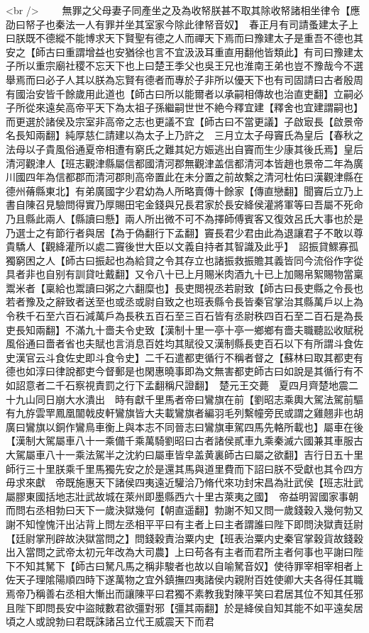 <br />
　　無罪之父母妻子同產坐之及為收帑朕甚不取其除收帑諸相坐律令【應劭曰帑子也秦法一人有罪并坐其室家今除此律帑音奴】　春正月有司請蚤建太子上曰朕既不德縱不能博求天下賢聖有德之人而禪天下焉而曰豫建太子是重吾不德也其安之【師古曰重謂增益也安猶徐也言不宜汲汲耳重直用翻他皆類此】有司曰豫建太子所以重宗廟社稷不忘天下也上曰楚王季父也吳王兄也淮南王弟也豈不豫哉今不選舉焉而曰必子人其以朕為忘賢有德者而專於子非所以優天下也有司固請曰古者殷周有國治安皆千餘歲用此道也【師古曰所以能爾者以承嗣相傳故也治直吏翻】立嗣必子所從來遠矣高帝平天下為太祖子孫繼嗣世世不絶今釋宜建【釋舍也宜建謂嗣也】而更選於諸侯及宗室非高帝之志也更議不宜【師古曰不當更議】子啟㝡長【啟景帝名長知兩翻】純厚慈仁請建以為太子上乃許之　三月立太子母竇氏為皇后【春秋之法母以子貴風俗通夏帝相遭有窮氏之難其妃方娠逃出自竇而生少康其後氏焉】皇后清河觀津人【班志觀津縣屬信都國清河郡無觀津盖信都清河本皆趙也景帝二年為廣川國四年為信都郡而清河郡則高帝置此在未分置之前故繫之清河杜佑曰漢觀津縣在德州蓨縣東北】有弟廣國字少君幼為人所略賣傳十餘家【傳直戀翻】聞竇后立乃上書自陳召見驗問得實乃厚賜田宅金錢與兄長君家於長安絳侯灌將軍等曰吾屬不死命乃且縣此兩人【縣讀曰懸】兩人所出微不可不為擇師傅賓客又復效呂氏大事也於是乃選士之有節行者與居【為于偽翻行下孟翻】竇長君少君由此為退讓君子不敢以尊貴驕人【觀絳灌所以處二竇後世大臣以文義自持者其智識及此乎】　詔振貸鰥寡孤獨窮困之人【師古曰振起也為給貸之令其存立也諸振救振贍其義皆同今流俗作字從具者非也自别有訓貸吐戴翻】又令八十已上月賜米肉酒九十已上加賜帛絮賜物當稟鬻米者【稟給也鬻讀曰粥之六翻糜也】長吏閲視丞若尉致【師古曰長吏縣之令長也若者豫及之辭致者送至也或丞或尉自致之也班表縣令長皆秦官掌治其縣萬戶以上為令秩千石至六百石減萬戶為長秩五百石至三百石皆有丞尉秩四百石至二百石是為長吏長知兩翻】不滿九十嗇夫令史致【漢制十里一亭十亭一鄉鄉有嗇夫職聽訟收賦税風俗通曰嗇者省也夫賦也言消息百姓均其賦役又漢制縣長吏百石以下有所謂斗食佐史漢官云斗食佐史即斗食令史】二千石遣都吏循行不稱者督之【蘇林曰取其都吏有德也如淳曰律說都吏今督郵是也閑惠曉事即為文無害都吏師古曰如說是其循行有不如詔意者二千石察視責罰之行下孟翻稱尺證翻】　楚元王交薨　夏四月齊楚地震二十九山同日崩大水潰出　時有獻千里馬者帝曰鸞旗在前【劉昭志乘輿大駕法駕前驅有九斿雲䍐鳳凰闟戟皮軒鸞旗皆大夫載鸞旗者編羽毛列繫幢旁民或謂之雞翹非也胡廣曰鸞旗以銅作鸞鳥車衡上與本志不同晉志曰鸞旗車駕四馬先輅所載也】屬車在後【漢制大駕屬車八十一乘備千乘萬騎劉昭曰古者諸侯貳車九乘秦滅六國兼其車服古大駕屬車八十一乘法駕半之沈約曰屬車皆皁盖黄裏師古曰屬之欲翻】吉行日五十里師行三十里朕乘千里馬獨先安之於是還其馬與道里費而下詔曰朕不受獻也其令四方毋求來獻　帝既施惠天下諸侯四夷遠近驩洽乃脩代來功封宋昌為壯武侯【班志壯武屬膠東國括地志壯武故城在萊州即墨縣西六十里古萊夷之國】　帝益明習國家事朝而問右丞相勃曰天下一歲決獄幾何【朝直遥翻】勃謝不知又問一歲錢穀入幾何勃又謝不知惶愧汗出沾背上問左丞相平平曰有主者上曰主者謂誰曰陛下即問決獄責廷尉【廷尉掌刑辟故決獄當問之】問錢穀責治粟内史【班表治粟内史秦官掌穀貨故錢穀出入當問之武帝太初元年改為大司農】上曰苟各有主者而君所主者何事也平謝曰陛下不知其駑下【師古曰駑凡馬之稱非駿者也故以自喻駑音奴】使待罪宰相宰相者上佐天子理隂陽順四時下遂萬物之宜外鎮撫四夷諸侯内親附百姓使卿大夫各得任其職焉帝乃稱善右丞相大慚出而讓陳平曰君獨不素教我對陳平笑曰君居其位不知其任邪且陛下即問長安中盜賊數君欲彊對邪【彊其兩翻】於是絳侯自知其能不如平遠矣居頃之人或說勃曰君既誅諸呂立代王威震天下而君